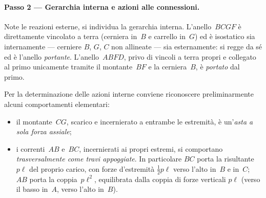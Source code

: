 \paragraph{Passo 2 --- Gerarchia interna e azioni
	alle connessioni.}

Note le reazioni esterne, si individua la gerarchia
interna. L'anello~$BCGF$ è direttamente vincolato a
terra (cerniera in~$B$ e carrello in~$G$) ed è isostatico
sia internamente --- cerniere $B$, $G$, $C$ non allineate
--- sia esternamente: si regge da sé ed è l'anello
\emph{portante}. L'anello~$ABFD$, privo di vincoli a
terra propri e collegato al primo unicamente tramite il
montante~$BF$ e la cerniera~$B$, è \emph{portato} dal
primo.

Per la determinazione delle azioni interne conviene
riconoscere preliminarmente alcuni comportamenti
elementari:
\begin{itemize}[noitemsep]
	\item il montante~$CG$, scarico e incernierato a
	entrambe le estremità, è un'\emph{asta a sola forza
		assiale};
	\item i correnti~$AB$ e~$BC$, incernierati ai propri
	estremi, si comportano \emph{trasversalmente come travi
		appoggiate}. In particolare $BC$ porta la risultante
	$p\ell$ del proprio carico, con forze d'estremità
	$\tfrac12 p\ell$ verso l'alto in~$B$ e in~$C$; $AB$
	porta la coppia~$p\ell^2$, equilibrata dalla coppia di
	forze verticali $p\ell$ (verso il basso in~$A$, verso
	l'alto in~$B$).
\end{itemize}


